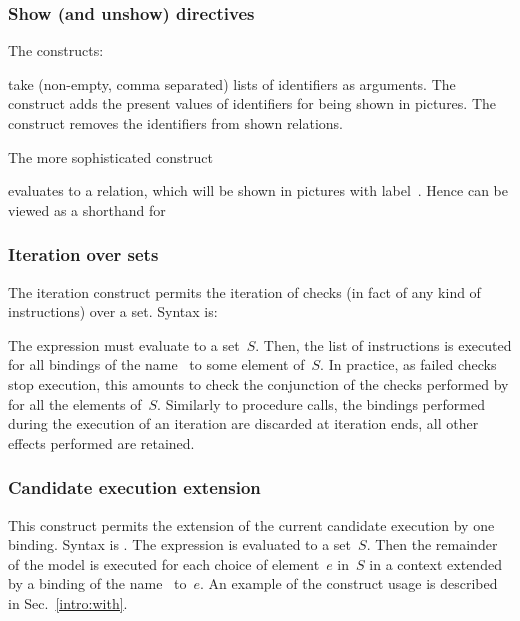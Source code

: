 \subsubsection*{Show (and unshow) directives}
\label{show:def}The constructs:
\begin{center}
\quad{}
\end{center}
take (non-empty, comma separated) lists of identifiers as arguments.
The  construct adds the present values of identifiers for being
shown in pictures.
The  construct removes the identifiers from shown relations.

The more sophisticated construct
\begin{center}\end{center}
evaluates  to a relation, which will be shown in pictures with
label~.
Hence   can be viewed as a shorthand
for 

\subsubsection*{Iteration over sets}
The  iteration construct 
permits the iteration of checks (in fact of any kind of instructions)
over a set. Syntax is:
\begin{center}
      
\end{center}
The expression  must evaluate to a set~$S$.
Then, the list of instructions  is executed
for all bindings of the name~ to some element of~$S$.
In practice, as failed checks stop execution, this amounts
to check the conjunction of the checks performed by 
for all the elements of~$S$.
Similarly to procedure calls,
the bindings performed during the execution of an iteration
are discarded at iteration ends, all other effects performed are
retained.

\subsubsection*{Candidate execution extension}
This construct permits the extension of the current candidate
execution by one binding.
Syntax is .
The expression  is evaluated to a set~$S$.
Then the remainder of the model is executed for each choice
of element~$e$ in~$S$ in a context extended by a binding
of the name~ to~$e$.
An example of the construct usage is described in Sec.~\ref{intro:with}.

